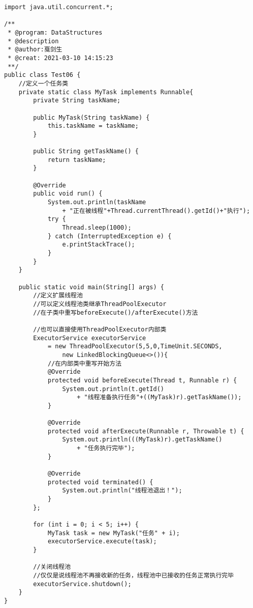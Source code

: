 \documentclass[a4paper]{report}
\begin{document}
\begin{Verbatim}[frame=single,numbersep=5pt,xleftmargin=1.5em,xrightmargin=1.5em]
import java.util.concurrent.*;

/**
 * @program: DataStructures
 * @description
 * @author:戛剑生
 * @creat: 2021-03-10 14:15:23
 **/
public class Test06 {
    //定义一个任务类
    private static class MyTask implements Runnable{
        private String taskName;

        public MyTask(String taskName) {
            this.taskName = taskName;
        }

        public String getTaskName() {
            return taskName;
        }

        @Override
        public void run() {
            System.out.println(taskName
                + "正在被线程"+Thread.currentThread().getId()+"执行");
            try {
                Thread.sleep(1000);
            } catch (InterruptedException e) {
                e.printStackTrace();
            }
        }
    }

    public static void main(String[] args) {
        //定义扩展线程池
        //可以定义线程池类继承ThreadPoolExecutor
        //在子类中重写beforeExecute()/afterExecute()方法

        //也可以直接使用ThreadPoolExecutor内部类
        ExecutorService executorService
            = new ThreadPoolExecutor(5,5,0,TimeUnit.SECONDS,
                new LinkedBlockingQueue<>()){
            //在内部类中重写开始方法
            @Override
            protected void beforeExecute(Thread t, Runnable r) {
                System.out.println(t.getId()
                    + "线程准备执行任务"+((MyTask)r).getTaskName());
            }

            @Override
            protected void afterExecute(Runnable r, Throwable t) {
                System.out.println(((MyTask)r).getTaskName()
                    + "任务执行完毕");
            }

            @Override
            protected void terminated() {
                System.out.println("线程池退出！");
            }
        };

        for (int i = 0; i < 5; i++) {
            MyTask task = new MyTask("任务" + i);
            executorService.execute(task);
        }

        //关闭线程池
        //仅仅是说线程池不再接收新的任务，线程池中已接收的任务正常执行完毕
        executorService.shutdown();
    }
}\end{Verbatim}
\end{document}
